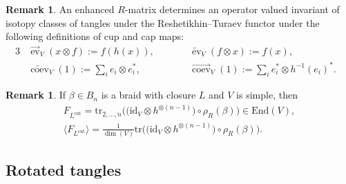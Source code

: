 \documentclass[10pt,a4paper]{amsart}
\numberwithin{equation}{section}
\theoremstyle{definition}
\newtheorem{Remark}[Theorem]{Remark}
\begin{document}
\begin{Remark}
\label{rem.cups}
An enhanced $R$-matrix determines an operator valued invariant of isotopy classes
of tangles under the Reshetikhin--Turaev functor under the following definitions of
cup and cap maps:
\begin{alignat*}{3}
& \overrightarrow{\operatorname{ev}}_V(x \otimes f) := f(h(x)), \qquad &&
\overleftarrow{\operatorname{ev}}_V(f \otimes x) := f(x), &\\
& \overleftarrow{\operatorname{coev}}_V(1) := \sum_{i} e_i \otimes e_i^\ast, \qquad &&
\overrightarrow{\operatorname{coev}}_V(1) := \sum_{i} e_i^\ast \otimes h^{-1}(e_i)^\ast .&
\end{alignat*}
\end{Remark}

\begin{Remark}
\label{rem.Lcut}
If $\beta\in B_n$ is a braid with closure $L$ {and $V$ is simple}, then
\begin{gather*}
F_{L^{\mathrm{cut}}} =
\mathrm{tr}_{2,\dots, n}\bigl(\bigl(\mathrm{id}_V\otimes
h^{\otimes (n-1)}\bigr)\circ \rho_R(\beta) \bigr)\in \mathrm{End}(V),
\\
\langle F_{L^{\mathrm{cut}}}\rangle
=
\frac{1}{\dim(V)}
\mathrm{tr}\bigl(\bigl(\mathrm{id}_V\otimes
h^{\otimes (n-1)}\bigr)\circ \rho_R(\beta)\bigr) .
\end{gather*}
\end{Remark}

\subsection{Rotated tangles}
\end{document}
